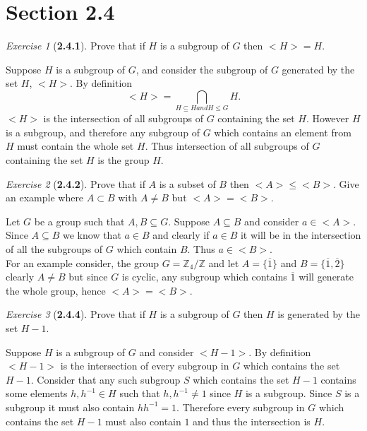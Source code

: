\documentclass[12pt]{amsart}
\makeatletter
\theoremstyle{remark}
\newtheorem*{exercise}{Exercise}%
\def\ZZ{\ensuremath{\mathbb Z}}
\renewenvironment{proof}[1][\proofname]{\par\doublespacing
  \pushQED{\qed}%
  \normalfont \topsep6\p@\@plus6\p@\relax
  \list{}{%
    \settowidth{\leftmargin}{\itshape\proofname:\hskip\labelsep}%
    \setlength{\labelwidth}{0pt}%
    \setlength{\itemindent}{-\leftmargin}%
  }%
  \item[\hskip\labelsep\itshape#1\@addpunct{:}]\ignorespaces
}{%
  \popQED\endlist\@endpefalse
  \singlespacing
}
\theoremstyle{mycomment}
\makeatother
\begin{document}
\section*{\textbf{Section 2.4}}
\begin{exercise}[\textbf{2.4.1}] Prove that if $H$ is a subgroup of $G$ then $<H> = H$. 
  \begin{proof} Suppose $H$ is a subgroup of $G$, and consider the subgroup of $G$ generated by the set $H$, $<H>$. By definition 
    \begin{equation*}
      <H> = \bigcap_{H \subseteq H and H \leq G} H. 
    \end{equation*}
    $<H>$ is the intersection of all subgroups of $G$ containing the set $H$. However $H$ is a subgroup, and therefore any subgroup of $G$ which contains an element from $H$
    must contain the whole set $H$. Thus intersection of all subgroups of $G$ containing the set $H$ is the group $H$. 
    \end{proof}
\end{exercise}
\vspace{.15in}


\begin{exercise}[\textbf{2.4.2}] Prove that if $A$ is a subset of $B$ then $<A> \leq <B>$. Give an example where $A \subset B$ with $A \neq B$ but $<A> = <B>$. 
  \begin{proof} Let $G$ be a group such that $A, B \subseteq G$. Suppose $A \subseteq B$ and consider $a \in <A>$. Since $A \subseteq B$ we know that $a \in B$ and clearly 
    if $a \in B$ it will be in the intersection of all the subgroups of $G$ which contain $B$. Thus $a \in <B>$. \\
    For an example consider, the group $G = \ZZ_4/\ZZ$ and let $A = \{\overline{1}\}$ and $B = \{\overline{1},\overline{2}\}$ clearly $A \neq B$ but since $G$ is cyclic, any subgroup 
    which contains $\overline{1}$ will generate the whole group, hence $<A> = <B>$.
  \end{proof}
\end{exercise}
\vspace{.15in}


\begin{exercise}[\textbf{2.4.4}] Prove that if $H$ is a subgroup of $G$ then $H$ is generated by the set $H - {1}$.
    \begin{proof} Suppose $H$ is a subgroup of $G$ and consider $<H - {1}>$. By definition  $<H - {1}>$ is the intersection of every subgroup
      in $G$ which contains the set $H - {1}$. Consider that any such subgroup $S$ which contains the set $H - {1}$ contains some elements $h, h^{-1} \in H$ 
      such that $h, h^{-1} \neq 1$ since $H$ is a subgroup. Since $S$ is a subgroup it must also contain $hh^{-1} = 1$. Therefore every subgroup
      in $G$ which contains the set $H - {1}$ must also contain $1$ and thus the intersection is $H$. 
    \end{proof}
\end{exercise}
\vspace{.15in}
\end{document}

